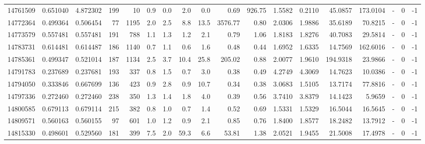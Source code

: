 \begin{tabular}{rrrrrrrrrrrrrrrlrr}
  14761509 & 0.651040 &   4.872302 &  199 &   10 &      0.9 &      0.0 &     2.0 &      0.0 &       0.69 &      926.75 &  1.5582 &  0.2110 &   45.0857 &  173.0104 &             - &        0 &         -1 \\
  14772364 & 0.499364 &   0.506454 &   77 & 1195 &      2.0 &      2.5 &     8.8 &     13.5 &    3576.77 &        0.80 &  2.0306 &  1.9886 &   35.6189 &   70.8215 &             - &        0 &         -1 \\
  14773579 & 0.557481 &   0.557481 &  191 &  788 &      1.1 &      1.3 &     1.2 &      2.1 &       0.79 &        1.06 &  1.8183 &  1.8276 &   40.7083 &   29.5814 &             - &        0 &         -1 \\
  14783731 & 0.614481 &   0.614487 &  186 & 1140 &      0.7 &      1.1 &     0.6 &      1.6 &       0.48 &        0.44 &  1.6952 &  1.6335 &   14.7569 &  162.6016 &             - &        0 &         -1 \\
  14785361 & 0.499347 &   0.521014 &  187 & 1134 &      2.5 &      3.7 &    10.4 &     25.8 &     205.02 &        0.88 &  2.0077 &  1.9610 &  194.9318 &   23.9866 &             - &        0 &         -1 \\
  14791783 & 0.237689 &   0.237681 &  193 &  337 &      0.8 &      1.5 &     0.7 &      3.0 &       0.38 &        0.49 &  4.2749 &  4.3069 &   14.7623 &   10.0386 &             - &        0 &         -1 \\
  14794050 & 0.333846 &   0.667699 &  136 &  423 &      0.9 &      2.8 &     0.9 &     10.7 &       0.34 &        0.38 &  3.0683 &  1.5105 &   13.7174 &   77.8816 &             - &        0 &         -1 \\
  14797336 & 0.272460 &   0.272460 &  238 &  350 &      1.3 &      1.4 &     1.8 &      4.0 &       0.39 &        0.56 &  3.7410 &  3.8379 &   14.1423 &    5.9659 &             - &        0 &         -1 \\
  14800585 & 0.679113 &   0.679114 &  215 &  382 &      0.8 &      1.0 &     0.7 &      1.4 &       0.52 &        0.69 &  1.5331 &  1.5329 &   16.5044 &   16.5645 &             - &        0 &         -1 \\
  14809571 & 0.560163 &   0.560155 &   97 &  601 &      1.0 &      1.2 &     0.9 &      2.1 &       0.85 &        0.76 &  1.8400 &  1.8577 &   18.2482 &   13.7912 &             - &        0 &         -1 \\
  14815330 & 0.498601 &   0.529560 &  181 &  399 &      7.5 &      2.0 &    59.3 &      6.6 &      53.81 &        1.38 &  2.0521 &  1.9455 &   21.5008 &   17.4978 &             - &        0 &         -1 \\

\end{tabular}
